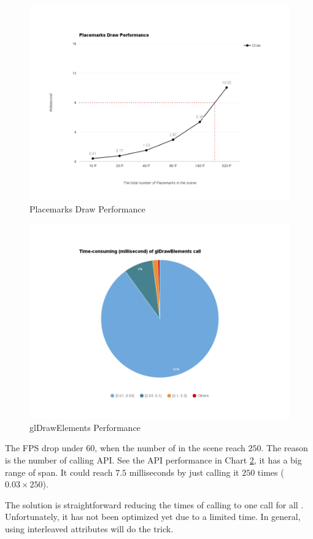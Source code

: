 \begin{figure}[H]
	\caption{Placemarks Draw Performance}
	\label{fig:placemarks-draw-performance}
	\centering
	\includegraphics[width=\textwidth, keepaspectratio]{Figures/placemarks-draw-performance.png}
	\decoRule
\end{figure}

\begin{figure}[H]
	\caption{glDrawElements Performance}
	\label{fig:glDrawElements-performance}
	\centering
	\includegraphics[width=\textwidth, keepaspectratio]{Figures/glDrawElements-performance.png}
	\decoRule
\end{figure}

The FPS drop under $60$, when the number of  in the scene reach $250$. The reason is the number of calling  API. See the API performance in Chart \ref{fig:glDrawElements-performance}, it has a big range of span. It could reach $7.5$ milliseconds by just calling it $250$ times ($0.03 \times 250$).

The solution is straightforward reducing the times of calling  to one call for all . Unfortunately, it has not been optimized yet due to a limited time. In general, using interleaved attributes will do the trick.


